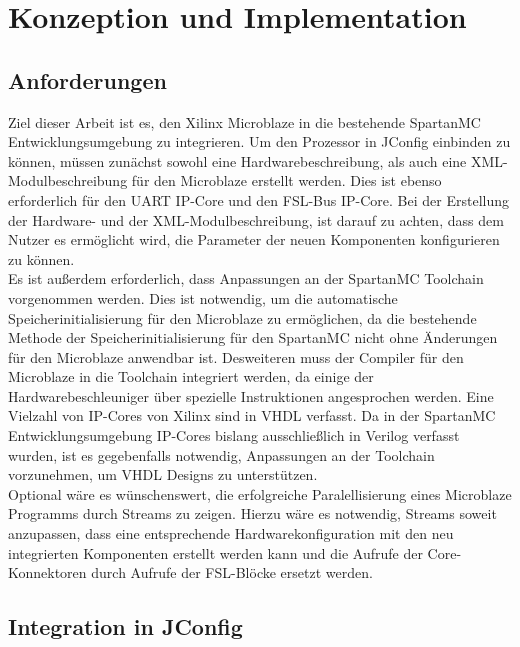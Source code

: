 \chapter{Konzeption und Implementation}
\section{Anforderungen}
Ziel dieser Arbeit ist es, den Xilinx Microblaze in die bestehende SpartanMC Entwicklungsumgebung zu integrieren. Um den Prozessor in JConfig einbinden zu können, müssen zunächst sowohl eine Hardwarebeschreibung, als auch eine XML-Modulbeschreibung für den Microblaze erstellt werden. Dies ist ebenso erforderlich für den UART IP-Core und den FSL-Bus IP-Core. Bei der Erstellung der Hardware- und der XML-Modulbeschreibung, ist darauf zu achten, dass dem Nutzer es ermöglicht wird, die Parameter der neuen Komponenten konfigurieren zu können.\\
Es ist außerdem erforderlich, dass Anpassungen an der SpartanMC Toolchain vorgenommen werden. Dies ist notwendig, um die automatische Speicherinitialisierung für den Microblaze zu ermöglichen, da die bestehende Methode der Speicherinitialisierung für den SpartanMC nicht ohne Änderungen für den Microblaze anwendbar ist. Desweiteren muss der Compiler für den Microblaze in die Toolchain integriert werden, da einige der Hardwarebeschleuniger über spezielle Instruktionen angesprochen werden. Eine Vielzahl von IP-Cores von Xilinx sind in VHDL verfasst. Da in der SpartanMC Entwicklungsumgebung IP-Cores bislang ausschließlich in Verilog verfasst wurden, ist es gegebenfalls notwendig, Anpassungen an der Toolchain vorzunehmen, um VHDL Designs zu unterstützen.\\
Optional wäre es wünschenswert, die erfolgreiche Paralellisierung eines Microblaze Programms durch \textmu\/Streams zu zeigen. Hierzu wäre es notwendig, 
\textmu\/Streams soweit anzupassen, dass eine entsprechende Hardwarekonfiguration mit den neu integrierten Komponenten erstellt werden kann und
die Aufrufe der Core-Konnektoren durch Aufrufe der FSL-Blöcke ersetzt werden.
\section{Integration in JConfig}
